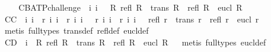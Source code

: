 \begin{isabellebody}
\ \isamarkupfalse%
%
\isadelimproof
\ %
\endisadelimproof
%
\isatagproof
{}\isamarkupfalse%
%
\endisatagproof
{\isafoldproof}%
%
\isadelimproof
%
\endisadelimproof
\isanewline
\isanewline
{}\isamarkupfalse%
\ C{}{}{\isacharunderscore}B{\isacharunderscore}ATP{\isacharunderscore}challenge{\isacharcolon}\ {\isachardoublequoteopen}{\isacharhash}\ i{}\ i{}\ {\isasymlongrightarrow}\ {\isasymnot}\ {\isacharparenleft}{\isasymforall}R{\isachardot}\ refl\ R\ {\isasymand}\ trans\ R\ {\isasymlongrightarrow}\ {\isacharparenleft}refl\ R\ {\isasymand}\ eucl\ R{\isacharparenright}{\isacharparenright}{\isachardoublequoteclose}\isanewline
%
\isadelimproof
\ %
\endisadelimproof
%
\isatagproof
{}\isamarkupfalse%
\ %
%
\endisatagproof
{\isafoldproof}%
%
\isadelimproof
\isanewline
%
\endisadelimproof
{}\isamarkupfalse%
\ C{}{}{\isacharunderscore}C{\isacharcolon}\ {\isachardoublequoteopen}{\isacharhash}\ i{}\ i{}\ {\isasymand}\ r\ i{}\ i{}\ {\isasymand}\ r\ i{}\ i{}\ {\isasymand}\ {\isasymnot}\ r\ i{}\ i{}\ {\isasymand}\ r\ i{}\ i{}\ {\isasymlongrightarrow}\ {\isasymnot}\ {\isacharparenleft}refl\ r\ {\isasymand}\ trans\ r\ {\isasymlongrightarrow}\ {\isacharparenleft}refl\ r\ {\isasymand}\ eucl\ r{\isacharparenright}{\isacharparenright}{\isachardoublequoteclose}\ \isanewline
%
\isadelimproof
\ %
\endisadelimproof
%
\isatagproof
{}\isamarkupfalse%
\ {\isacharparenleft}metis\ {\isacharparenleft}full{\isacharunderscore}types{\isacharparenright}\ trans{\isacharunderscore}def\ refl{\isacharunderscore}def\ eucl{\isacharunderscore}def{\isacharparenright}%
\endisatagproof
{\isafoldproof}%
%
\isadelimproof
\isanewline
%
\endisadelimproof
{}\isamarkupfalse%
\ C{}{}{\isacharunderscore}D{\isacharcolon}\ {\isachardoublequoteopen}{\isacharhash}\ i{}\ {\isasymlongrightarrow}\ {\isacharparenleft}{\isasymforall}R{\isachardot}\ refl\ R\ {\isasymand}\ trans\ R\ {\isasymlongrightarrow}\ {\isacharparenleft}refl\ R\ {\isasymand}\ eucl\ R{\isacharparenright}{\isacharparenright}{\isachardoublequoteclose}%
\isadelimproof
\ %
\endisadelimproof
%
\isatagproof
{}\isamarkupfalse%
\ {\isacharparenleft}metis\ {\isacharparenleft}full{\isacharunderscore}types{\isacharparenright}\ eucl{\isacharunderscore}def{\isacharparenright}%

\end{isabellebody}
